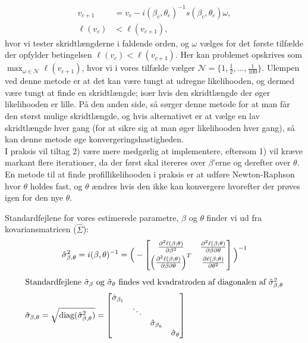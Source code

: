 \documentclass[11pt,a4paper]{article}
\begin{document}
\begin{align*}
    v_{c+1} &= v_{c} -  i(\beta_c,\theta_c)^{-1}s(\beta_c,\theta_c)\omega,\\
    \ell(v_{c}) &< \ell(v_{c+1}),
\end{align*}
hvor vi tester skridtlængderne i faldende orden, og $\omega$ vælges for det første tilfælde der opfylder betingelsen $\ell(v_c)<\ell(v_{c+1})$. 
Her kan problemet opskrives som 
$\max_{\omega \in \mathcal{N}} \ell(v_{c+1})$, hvor vi i vores tilfælde vælger 
$\mathcal{N} = \{1,\frac{1}{2},...,\frac{1}{100}\}$. Ulempen ved denne metode er at det kan være tungt at udregne likelihooden, og dermed være tungt at finde en skridtlængde; især hvis den skridtlængde der øger likelihooden er lille. På den anden side, så sørger denne metode for at man får den størst mulige skridtlængde, og hvis alternativet er at vælge en lav skridtlængde hver gang (for at sikre sig at man øger likelihooden hver gang), så kan denne metode øge konvergeringshastigheden.\\
I praksis vil tiltag 2) være mere medgørlig at implementere, eftersom 1) vil kræve markant flere iterationer, da der først skal itereres over $\beta$'erne og derefter over $\theta$. En metode til at finde profillikelihooden i praksis er at udføre Newton-Raphson hvor $\theta$ holdes fast, og $\theta$ ændres hvis den ikke kan konvergere hvorefter der prøves igen for den nye $\theta$.\par
Standardfejlene for vores estimerede parametre, $\beta$ og $\theta$ finder vi ud fra kovariansmatricen ($\hat{\Sigma}$): 
\begin{align*}
&\hat{\sigma}^2_{\beta,\theta}=i(\beta,\theta)^{-1}=
\Big{(}-\begin{bmatrix}
\frac{\partial^2 \ell(\beta;\theta)}{\partial \beta^2} &\frac{\partial^2 \ell(\beta;\theta)}{\partial \beta \partial \theta} \\
\Big{(}\frac{\partial^2 \ell(\beta;\theta)}{\partial \beta \partial \theta}\Big{)}^T & \frac{\partial \ell(\beta;\theta)}{\partial \theta^2}
\end{bmatrix}\Big{)}^{-1}\\
\end{align*}
\begin{align}
\intertext{Standardfejlene $\hat{\sigma}_\beta$ og $\hat{\sigma}_\theta$ findes ved kvadratroden af diagonalen af $\hat{\sigma}^2_{\beta,\theta}$}
\hat{\sigma}_{\beta,\theta}=\sqrt{\text{diag}(\hat{\sigma}^2_{\beta,\theta})}=
\begin{bmatrix}
\hat{\sigma}_{\beta_1}& &\\
& \ddots & \\
& & \hat{\sigma}_{\beta_k} \\
& & & \hat{\sigma}_{\theta}
\end{bmatrix}
\end{align}
\end{document}
